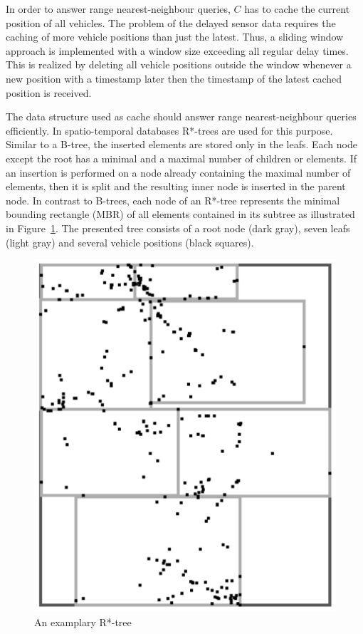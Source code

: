 In order to answer range nearest-neighbour queries, $C$ has to cache the current position of all vehicles. The problem of the delayed sensor data requires the caching of more vehicle positions than just the latest. Thus, a sliding window approach is implemented with a window size exceeding all regular delay times. This is realized by deleting all vehicle positions outside the window whenever a new position with a timestamp later then the timestamp of the latest cached position is received.

The data structure used as cache should answer range nearest-neighbour queries efficiently. In spatio-temporal databases R*-trees \cite{Beckmann1990TRA} are used for this purpose. Similar to a B-tree, the inserted elements are stored only in the leafs. Each node except the root has a minimal and a maximal number of children or elements. If an insertion is performed on a node already containing the maximal number of elements, then it is split and the resulting inner node is inserted in the parent node. In contrast to B-trees, each node of an R*-tree represents the minimal bounding rectangle (MBR) of all elements contained in its subtree as illustrated in Figure~\ref{fig:Rtree}. The presented tree consists of a root node (dark gray), seven leafs (light gray) and several vehicle positions (black squares).

\begin{figure}[htbp]
\centering
\includegraphics[scale=0.3,angle=90]{img/dgm/rTree.pdf}
\caption{An examplary R*-tree}\label{fig:Rtree}
\end{figure}

